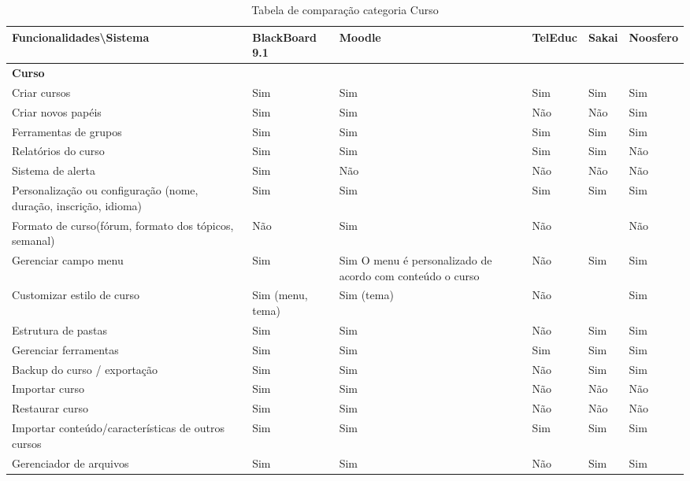 \begin{landscape}
\begin{table}[H]
\begin{tabular}{|@{}p{5.5cm}|p{3.5cm}|p{3.5cm}|p{3.5cm}|p{3.5cm}|p{3.5cm}@{}|}
\hline
\textbf{Funcionalidades\textbackslash Sistema} & \textbf{BlackBoard 9.1} & \textbf{Moodle} & \textbf{TelEduc} & \textbf{Sakai} & \textbf{Noosfero}\\ \hline
\textbf{Curso}&&   &&  &   \\
Criar cursos  & Sim & Sim & Sim  & Sim   & Sim    \\
Criar novos papéis& Sim & Sim & Não& Não   & Sim \\
Ferramentas de grupos & Sim & Sim & Sim& Sim   & Sim \\
Relatórios do curso   & Sim & Sim & Sim& Sim   & Não \\
Sistema de alerta & Sim & Não & Não& Não   & Não \\
Personalização ou configuração (nome, duração, inscrição, idioma) & Sim & Sim & Sim& Sim   & Sim    \\
Formato de curso(fórum, formato dos tópicos, semanal)& Não & Sim & Não&  & Não    \\
Gerenciar campo menu  & Sim & Sim {\tiny O menu é personalizado de acordo com conteúdo o curso} & Não& Sim   & Sim    \\
Customizar estilo de curso & Sim {\tiny (menu, tema)} & Sim {\tiny(tema) }& Não&  & Sim\\
Estrutura de pastas   & Sim & Sim & Não& Sim   & Sim    \\
Gerenciar ferramentas & Sim & Sim & Sim& Sim   & Sim    \\
Backup do curso / exportação & Sim & Sim & Não& Sim   & Sim\\
Importar curso& Sim & Sim & Não& Não   & Não \\
Restaurar curso & Sim & Sim & Não& Não   & Não    \\
Importar conteúdo/características de outros cursos   & Sim & Sim & Sim & Sim   & Sim    \\
Gerenciador de arquivos    & Sim & Sim & Não& Sim   & Sim \\ \hline
\end{tabular}
\caption{Tabela de comparação categoria Curso}
\label{tab:curso}
\end{table}


\end{landscape}
